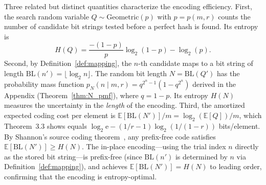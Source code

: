 \documentclass[hidelinks,11pt,final]{article}
\theoremstyle{plain}
\newcommand{\BL}{\mathrm{BL}}
\newcommand{\geodist}{\mathrm{Geometric}}
\newcommand{\Expect}[1]{\mathbb{E}\left[#1\right]}
\begin{document}
Three related but distinct quantities characterize the encoding efficiency.
First, the search random variable $Q \sim \geodist(p)$ with $p = p(m,r)$ counts the number of candidate bit strings tested before a perfect hash is found.
Its entropy is
\begin{equation}
    H(Q) = \frac{-(1-p)}{p} \log_2(1 - p) - \log_2(p).
\end{equation}
Second, by Definition~\ref{def:mapping}, the $n$-th candidate maps to a bit string of length $\BL(n') = \lfloor \log_2 n \rfloor$.
The random bit length $N = \BL(Q')$ has the probability mass function $p_N(n \mid m,r) = q^{2^n - 1}(1 - q^{2^n})$ derived in the Appendix (Theorem~\ref{thm:N_pmf}), where $q = 1 - p$.
Its entropy $H(N)$ measures the uncertainty in the \emph{length} of the encoding.
Third, the amortized expected coding cost per element is $\Expect{\BL(N')}/m = \log_2(\Expect{Q})/m$, which Theorem~3.3 shows equals $\log_2 \mathrm{e} - (1/r - 1)\log_2(1/(1-r))$ bits/element.
By Shannon's source coding theorem~\cite{shannon,coverandthomas}, any prefix-free code satisfies $\Expect{\BL(N')} \geq H(N)$.
The in-place encoding---using the trial index $n$ directly as the stored bit string---is prefix-free (since $\BL(n')$ is determined by $n$ via Definition~\ref{def:mapping}), and achieves $\Expect{\BL(N')} = H(N)$ to leading order, confirming that the encoding is entropy-optimal.
\end{document}

